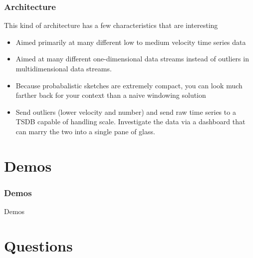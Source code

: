 \documentclass[aspectratio=169]{beamer}
\begin{document}
\begin{frame}
\frametitle{Architecture}
This kind of architecture has a few characteristics that are interesting
  \begin{itemize}
  \item Aimed primarily at many different low to medium velocity time series data\pause
  \item Aimed at many different one-dimensional data streams instead of outliers in multidimensional data streams.\pause
  \item Because probabalistic sketches are extremely compact, you can look much farther back for your context than a naive windowing solution\pause
  \item Send outliers (lower velocity and number) and send raw time series to a TSDB capable of handling scale.  Investigate the data via a dashboard that can marry the two into a single pane of glass.
  \end{itemize}
\end{frame}

\section{Demos}
\begingroup
\Huge
\begin{frame}
\frametitle{Demos}
\begin{center}
Demos
\end{center}
\end{frame}
\endgroup


\section{Questions}

\end{document}
